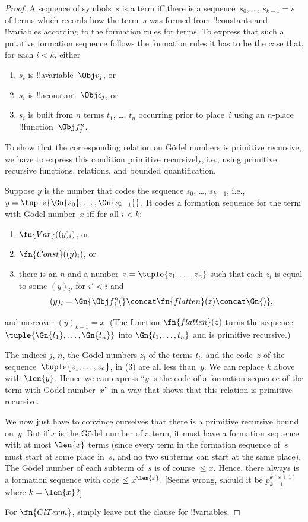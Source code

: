 \documentclass[../../../include/open-logic-section]{subfiles}
\begin{document}
\begin{proof}
A sequence of symbols~$s$ is a term iff there is a sequence~$s_0$,
\dots, $s_{k-1} = s$ of terms which records how the term~$s$ was formed
from !!{constant}s and !!{variable}s according to the formation rules
for terms. To express that such a putative formation sequence follows
the formation rules it has to be the case that, for each $i < k$, either
\begin{enumerate}
\item $s_i$ is !!a{variable}~$\Obj v_j$, or
\item $s_i$ is !!a{constant}~$\Obj c_j$, or
\item $s_i$ is built from $n$ terms $t_1$, \dots, $t_n$ occurring
  prior to place~$i$ using an $n$-place !!{function}~$\Obj f^n_j$.
\end{enumerate}
To show that the corresponding relation on G\"odel numbers is
primitive recursive, we have to express this condition primitive
recursively, i.e., using primitive recursive functions, relations, and
bounded quantification.

Suppose $y$ is the number that codes the sequence $s_0$, \dots, $s_{k-1}$,
i.e., $y = \tuple{\Gn{s_0}, \dots, \Gn{s_{k-1}}}$.  It codes a formation
sequence for the term with G\"odel number~$x$ iff for all $i < k$:
\begin{enumerate}
\item $\fn{Var}((y)_i)$, or
\item $\fn{Const}((y)_i)$, or
\item there is an $n$ and a number~$z = \tuple{z_1, \dots, z_n}$ such
  that each $z_l$ is equal to some $(y)_{i'}$ for $i' < i$ and
\[
(y)_i = \Gn{\Obj f^n_j(} \concat \fn{flatten}(z) \concat \Gn{)},
\]
\end{enumerate}
and moreover $(y)_{k-1} = x$.  (The function $\fn{flatten}(z)$ turns
the sequence $\tuple{\Gn{t_1}, \dots, \Gn{t_n}}$ into $\Gn{t_1, \dots,
  t_n}$ and is primitive recursive.)

The indices $j$, $n$, the G\"odel numbers $z_l$ of the terms $t_l$,
and the code~$z$ of the sequence~$\tuple{z_1, \dots, z_n}$, in (3) are
all less than~$y$.  We can replace $k$ above with $\len{y}$.  Hence we
can express ``$y$ is the code of a formation sequence of the term with
G\"odel number~$x$'' in a way that shows that this relation is
primitive recursive.

We now just have to convince ourselves that there is a primitive
recursive bound on~$y$.  But if $x$ is the G\"odel number of a term,
it must have a formation sequence with at most $\len{x}$ terms (since
every term in the formation sequence of~$s$ must start at some place
in~$s$, and no two subterms can start at the same place).  The G\"odel
number of each subterm of~$s$ is of course $\le x$.  Hence, there
always is a formation sequence with code $\le x^{\len{x}}$. 
[Seems wrong, should it be $p_{k-1}^{k(x+1)}$ where $k=\len{x}$?]

For $\fn{ClTerm}$, simply leave out the clause for !!{variable}s.
\end{proof}
\end{document}
